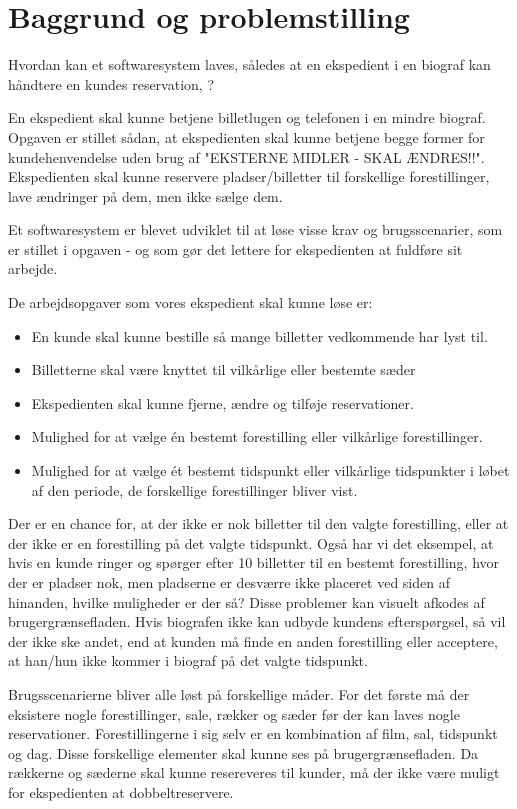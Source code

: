 \chapter{Baggrund og problemstilling}

Hvordan kan et softwaresystem laves, således at en ekspedient i en biograf kan håndtere en kundes reservation,  ?

En ekspedient skal kunne betjene billetlugen og telefonen i en mindre biograf. Opgaven er stillet sådan, at ekspedienten skal kunne betjene begge former for kundehenvendelse uden brug af "EKSTERNE MIDLER - SKAL ÆNDRES!!". Ekspedienten skal kunne reservere pladser/billetter til forskellige forestillinger, lave ændringer på dem, men ikke sælge dem.

Et softwaresystem er blevet udviklet til at løse visse krav og brugsscenarier, som er stillet i opgaven - og som gør det lettere for ekspedienten at fuldføre sit arbejde.

De arbejdsopgaver som vores ekspedient skal kunne løse er:
\begin{itemize}
  \item En kunde skal kunne bestille så mange billetter vedkommende har lyst til.
  \item Billetterne skal være knyttet til vilkårlige eller bestemte sæder
  \item Ekspedienten skal kunne fjerne, ændre og tilføje reservationer.
  \item Mulighed for at vælge én bestemt forestilling eller vilkårlige forestillinger.
  \item Mulighed for at vælge ét bestemt tidspunkt eller vilkårlige tidspunkter i løbet af den periode, de forskellige forestillinger bliver vist.
\end{itemize}

Der er en chance for, at der ikke er nok billetter til den valgte forestilling, eller at der ikke er en forestilling på det valgte tidspunkt. Også har vi det eksempel, at hvis en kunde ringer og spørger efter 10 billetter til en bestemt forestilling, hvor der er pladser nok, men pladserne er desværre ikke placeret ved siden af hinanden, hvilke muligheder er der så? Disse problemer kan visuelt afkodes af brugergrænsefladen. Hvis biografen ikke kan udbyde kundens efterspørgsel, så vil der ikke ske andet, end at kunden må finde en anden forestilling eller acceptere, at han/hun ikke kommer i biograf på det valgte tidspunkt.

Brugsscenarierne bliver alle løst på forskellige måder. For det første må der eksistere nogle forestillinger, sale, rækker og sæder før der kan laves nogle reservationer. Forestillingerne i sig selv er en kombination af film, sal, tidspunkt og dag. Disse forskellige elementer skal kunne ses på brugergrænsefladen. Da rækkerne og sæderne skal kunne resereveres til kunder, må der ikke være muligt for ekspedienten at dobbeltreservere.

